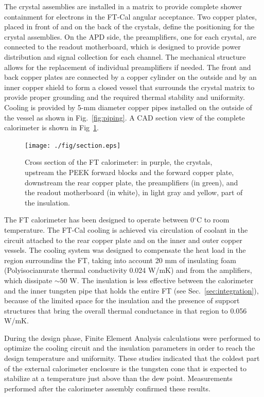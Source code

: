 The crystal assemblies are installed in a
matrix to provide complete shower containment
for electrons in the FT-Cal angular acceptance.
Two copper plates, placed in front of and on the back of the crystals, define the positioning for the crystal assemblies. On
the APD side, the preamplifiers, one for each crystal, are connected to the readout motherboard, which is designed to provide power distribution and signal collection for
each channel. The mechanical structure allows for the replacement of individual preamplifiers if needed. The front and back copper plates are connected by a copper cylinder on the outside and by an inner copper shield to form a closed vessel that surrounds the crystal matrix to provide proper grounding and the required thermal stability and uniformity. Cooling is provided by 5-mm diameter copper pipes installed on the outside of the vessel as shown in  Fig.~\ref{fig:piping}. A CAD section
view of the complete calorimeter is shown in Fig~\ref{fig:calsec}.
\begin{figure}[th!]
\centering 
\texttt{[image: ./fig/section.eps]}
\caption{Cross section of the FT calorimeter: in purple, the crystals, upstream the PEEK forward blocks and the forward copper plate, downstream the rear copper plate, the preamplifiers (in green), and the readout motherboard (in white), {\color{red} in light gray and yellow, part of the insulation.}}
\label{fig:calsec} 
\end{figure}


The FT calorimeter has been designed to operate
between 0$^\circ$C to room temperature. The FT-Cal cooling  is achieved via circulation
of coolant in the circuit attached to the rear copper
plate and on the inner and outer copper
vessels. The cooling system was designed
to compensate the heat load in the region surroundins the FT, taking into account
20 mm of insulating foam (Polyisocianurate thermal conductivity 0.024 W/mK)
and from the amplifiers, which  dissipate $\sim$50 W.
The insulation is less effective between the
calorimeter and the inner tungsten pipe that holds the entire FT (see Sec.~\ref{sec:integration}), because of the limited space for the insulation and the presence of support structures that bring the overall thermal conductance in that region to
0.056 W/mK.

During the design phase, Finite Element Analysis calculations 
were performed to optimize the cooling circuit and the insulation parameters in order to reach the 
design temperature and
uniformity. These studies indicated that the coldest part of the external calorimeter enclosure is 
the tungsten cone that is expected to stabilize
at a temperature just above than the dew
point. Measurements performed after the calorimeter assembly confirmed these results.


